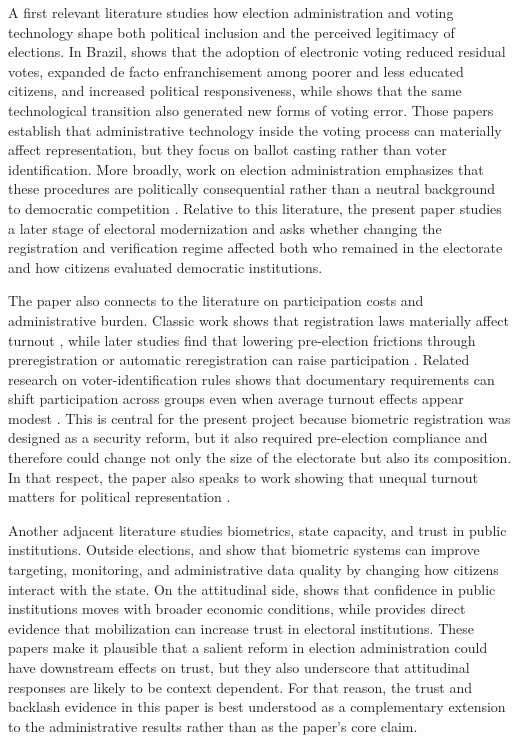A first relevant literature studies how election administration and voting technology shape both political inclusion and the perceived legitimacy of elections. In Brazil, \citet{Fujiwara2015VotingTechnoloPolitica} shows that the adoption of electronic voting reduced residual votes, expanded de facto enfranchisement among poorer and less educated citizens, and increased political responsiveness, while \citet{Zucco2016TradingOldErrors} shows that the same technological transition also generated new forms of voting error. Those papers establish that administrative technology inside the voting process can materially affect representation, but they focus on ballot casting rather than voter identification. More broadly, work on election administration emphasizes that these procedures are politically consequential rather than a neutral background to democratic competition \citep{Ferrer2023HowPartisanLocal, Bubeck2017ProcessCandidatThe}. Relative to this literature, the present paper studies a later stage of electoral modernization and asks whether changing the registration and verification regime affected both who remained in the electorate and how citizens evaluated democratic institutions.

The paper also connects to the literature on participation costs and administrative burden. Classic work shows that registration laws materially affect turnout \citep{Rosenstone1978TheEffectRegistra, Ansolabehere2005TheIntroducVoter}, while later studies find that lowering pre-election frictions through preregistration or automatic reregistration can raise participation \citep{Holbein2014MakingYoungVoters, Kim2022AutomatiVoterReregist}. Related research on voter-identification rules shows that documentary requirements can shift participation across groups even when average turnout effects appear modest \citep{Fraga2021WhoVoterLaws}. This is central for the present project because biometric registration was designed as a security reform, but it also required pre-election compliance and therefore could change not only the size of the electorate but also its composition. In that respect, the paper also speaks to work showing that unequal turnout matters for political representation \citep{Hajnal2005WhereTurnoutMatters}.

Another adjacent literature studies biometrics, state capacity, and trust in public institutions. Outside elections, \citet{Muralidharan2016BuildingStateCapacity} and \citet{Bossuroy2024BiometriMonitoriService} show that biometric systems can improve targeting, monitoring, and administrative data quality by changing how citizens interact with the state. On the attitudinal side, \citet{Stevenson2011TrustPublicInstitut} shows that confidence in public institutions moves with broader economic conditions, while \citet{Marx2021VoterMobilisaAnd} provides direct evidence that mobilization can increase trust in electoral institutions. These papers make it plausible that a salient reform in election administration could have downstream effects on trust, but they also underscore that attitudinal responses are likely to be context dependent. For that reason, the trust and backlash evidence in this paper is best understood as a complementary extension to the administrative results rather than as the paper's core claim.

